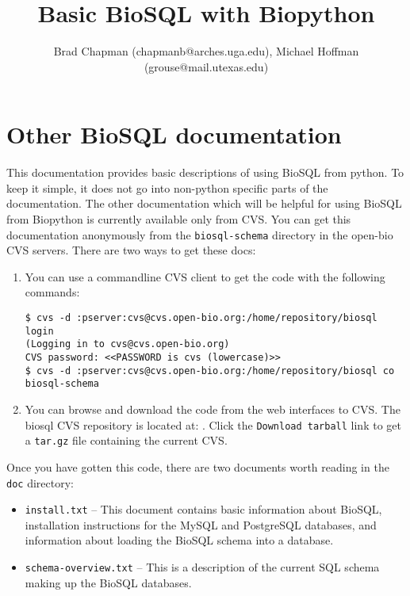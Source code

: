 \documentclass{article}
\begin{document}
\title{Basic BioSQL with Biopython}
\author{Brad Chapman (chapmanb@arches.uga.edu), Michael Hoffman
(grouse@mail.utexas.edu)}

\maketitle
\tableofcontents

\section{Other BioSQL documentation}

This documentation provides basic descriptions of using BioSQL from
python. To keep it simple, it does not go into non-python specific parts
of the documentation. The other documentation which will be helpful for
using BioSQL from Biopython is currently available only from CVS. You
can get this documentation anonymously from the \verb|biosql-schema|
directory in the open-bio CVS servers. There are two ways to get these
docs:

\begin{enumerate}
\item You can use a commandline CVS client to get the code with the
following commands:

\begin{verbatim}
$ cvs -d :pserver:cvs@cvs.open-bio.org:/home/repository/biosql login
(Logging in to cvs@cvs.open-bio.org)
CVS password: <<PASSWORD is cvs (lowercase)>>
$ cvs -d :pserver:cvs@cvs.open-bio.org:/home/repository/biosql co
biosql-schema
\end{verbatim}

\item You can browse and download the code from the web interfaces to
CVS. The biosql CVS repository is located at:
.
Click the \verb|Download tarball| link to get a \verb|tar.gz| file
containing the current CVS.
\end{enumerate}

Once you have gotten this code, there are two documents worth reading in
the \verb|doc| directory:

\begin{itemize}
  \item \verb|install.txt| -- This document contains basic information
  about BioSQL, installation instructions for the MySQL and PostgreSQL
  databases, and information about loading the BioSQL schema into a
  database.

  \item \verb|schema-overview.txt| -- This is a description of the
  current SQL schema making up the BioSQL databases.
\end{itemize}
\end{document}
